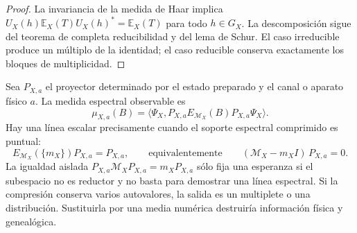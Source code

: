 \begin{proof}
La invariancia de la medida de Haar implica
\(U_X(h)\mathbb E_X(T)U_X(h)^*=\mathbb E_X(T)\) para todo \(h\in G_X\).
La descomposición sigue del teorema de completa reducibilidad y del lema de
Schur. El caso irreducible produce un múltiplo de la identidad; el caso
reducible conserva exactamente los bloques de multiplicidad.
\end{proof}

Sea \(P_{X,a}\) el proyector determinado por el estado preparado y el canal o
aparato físico \(a\). La medida espectral observable es
\[
 \mu_{X,a}(B)=
 \langle\Psi_X,
 P_{X,a}E_{\mathcal M_X}(B)P_{X,a}\Psi_X\rangle.
\]
Hay una línea escalar precisamente cuando el soporte espectral comprimido es
puntual:
\[
 E_{\mathcal M_X}(\{m_X\})P_{X,a}=P_{X,a},
 \qquad\text{equivalentemente}\qquad
 (\mathcal M_X-m_X I)\,P_{X,a}=0.
\]
La igualdad aislada
\(P_{X,a}\mathcal M_X P_{X,a}=m_X P_{X,a}\) sólo fija una esperanza si el
subespacio no es reductor y no basta para demostrar una línea espectral.
Si la compresión conserva varios autovalores, la salida es un multiplete o una
distribución. Sustituirla por una media numérica destruiría información
física y genealógica.



